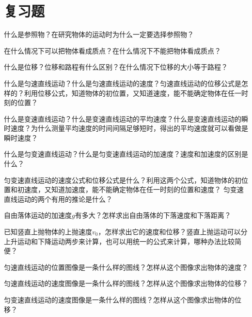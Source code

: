 \section*{复习题}

\begin{QsNum}
    \item 什么是参照物？在研究物体的运动时为什么一定要选择参照物？

          在什么情况下可以把物体看成质点？在什么情况下不能把物体看成质点？
    \item 什么是位移？位移和路程有什么区别？在什么情况下位移的大小等于路程？
    \item 什么是匀速直线运动？什么是匀速直线运动的速度？匀速直线运动的位移公式是怎样的？利用位移公式，知道物体的初位置，又知道速度，能不能确定物体在任一时刻的位置？
    \item 什么是变速直线运动？什么是变速直线运动的平均速度？什么是变速直线运动的瞬时速度？为什么测量平均速度的时间间隔足够短时，得出的平均速度就可以看做是瞬时速度？
    \item 什么是匀变速直线运动？什么是匀变速直线运动的加速度？速度和加速度的区别是什么？
    \item 匀变速直线运动的速度公式和位移公式是什么？利用这两个公式，知道物体的初位置和初速度，又知道加速度，能不能确定物体在任一时刻的位置和速度？
          匀变速直线运动的两个有用的推论是什么？
    \item 自由落体运动的加速度$g$有多大？怎样求出自由落体的下落速度和下落距离？
    \item 已知竖直上抛物体的上抛速度$v_0$，怎样求出它的速度和位移？竖直上抛运动可以分上升运动和下降运动两步来计算，也可以用统一的公式来计算，哪种办法比较简便？
    \item 匀速直线运动的位置图像是一条什么样的图线？怎样从这个图像求出物体的速度？

          匀速直线运动的速度图像是一条什么样的图线？怎样从这个图像求出物体的位移？

          匀变速直线运动的速度图像是一条什么样的图线？怎样从这个图像求出物体的位移？


\end{QsNum}
